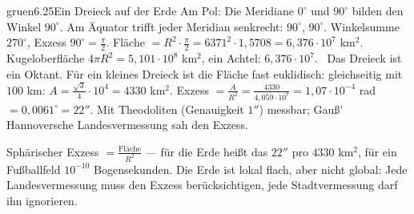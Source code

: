\begin{loesungkarte}{gruen}{6.25}{Ein Dreieck auf der Erde}
Am Pol: Die Meridiane $0^{\circ}$ und $90^{\circ}$ bilden den Winkel $90^{\circ}$. Am Äquator trifft jeder Meridian senkrecht: $90^{\circ}$, $90^{\circ}$. Winkelsumme $270^{\circ}$, Exzess $90^{\circ} = \frac\pi2$. Fläche $= R^{2}\cdot\frac\pi2 = 6371^{2}\cdot1{,}5708 = 6{,}376\cdot10^{7}$ km$^{2}$.
Kugeloberfläche $4\pi R^{2} = 5{,}101\cdot10^{8}$ km$^{2}$, ein Achtel: $6{,}376\cdot10^{7}$. \checkmark\ Das Dreieck ist ein Oktant.
Für ein kleines Dreieck ist die Fläche fast euklidisch: gleichseitig mit $100$ km: $A = \frac{\sqrt3}4\cdot10^{4} = 4330$ km$^{2}$. Exzess $= \frac A{R^{2}} = \frac{4330}{4{,}059\cdot10^{7}} = 1{,}07\cdot10^{-4}$ rad $= 0{,}0061^{\circ} = 22''$. Mit Theodoliten (Genauigkeit $1''$) messbar; Gauß' Hannoversche Landesvermessung sah den Exzess.
\begin{mitnehmen}\kastentext
Sphärischer Exzess $= \frac{\text{Fläche}}{R^{2}}$ --- für die Erde heißt das $22''$ pro $4330$ km$^{2}$, für ein Fußballfeld $10^{-10}$ Bogensekunden. Die Erde ist lokal flach, aber nicht global: Jede Landesvermessung muss den Exzess berücksichtigen, jede Stadtvermessung darf ihn ignorieren.
\end{mitnehmen}
\end{loesungkarte}

